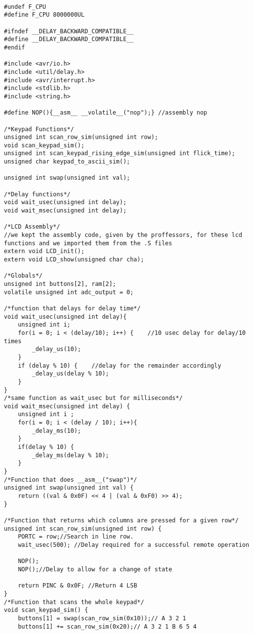 \documentclass[11pt]{article}
\begin{document}
\begin{verbatim}

#undef F_CPU
#define F_CPU 8000000UL

#ifndef __DELAY_BACKWARD_COMPATIBLE__
#define __DELAY_BACKWARD_COMPATIBLE__
#endif

#include <avr/io.h>
#include <util/delay.h>
#include <avr/interrupt.h>
#include <stdlib.h>
#include <string.h>

#define NOP(){__asm__ __volatile__("nop");} //assembly nop

/*Keypad Functions*/
unsigned int scan_row_sim(unsigned int row);
void scan_keypad_sim();
unsigned int scan_keypad_rising_edge_sim(unsigned int flick_time);
unsigned char keypad_to_ascii_sim();

unsigned int swap(unsigned int val);

/*Delay functions*/
void wait_usec(unsigned int delay);
void wait_msec(unsigned int delay);

/*LCD Assembly*/
//we kept the assembly code, given by the proffessors, for these lcd functions and we imported them from the .S files 
extern void LCD_init();
extern void LCD_show(unsigned char cha);

/*Globals*/
unsigned int buttons[2], ram[2];
volatile unsigned int adc_output = 0;

/*function that delays for delay time*/
void wait_usec(unsigned int delay){
	unsigned int i;
	for(i = 0; i < (delay/10); i++) {    //10 usec delay for delay/10 times
		_delay_us(10);
	}
	if (delay % 10) {    //delay for the remainder accordingly
		_delay_us(delay % 10);
	}
}
/*same function as wait_usec but for milliseconds*/
void wait_msec(unsigned int delay) {
	unsigned int i ;
	for(i = 0; i < (delay / 10); i++){
		_delay_ms(10);
	}
	if(delay % 10) {
		_delay_ms(delay % 10);
	}
}
/*Function that does __asm__("swap")*/
unsigned int swap(unsigned int val) {
	return ((val & 0x0F) << 4 | (val & 0xF0) >> 4);
}

/*Function that returns which columns are pressed for a given row*/
unsigned int scan_row_sim(unsigned int row) {
	PORTC = row;//Search in line row.
	wait_usec(500); //Delay required for a successful remote operation
	
	NOP();
	NOP();//Delay to allow for a change of state
	
	return PINC & 0x0F; //Return 4 LSB
}
/*Function that scans the whole keypad*/
void scan_keypad_sim() {
	buttons[1] = swap(scan_row_sim(0x10));// A 3 2 1
	buttons[1] += scan_row_sim(0x20);// A 3 2 1 B 6 5 4


\end{verbatim}
\end{document}
